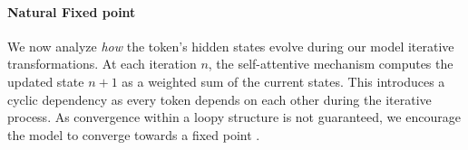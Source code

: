 
\paragraph{Natural Fixed point} We now analyze \textit{how} the token's hidden states evolve during our model iterative transformations. At each iteration $n$, the self-attentive mechanism \parencite{vaswani_17} computes the updated state $n+1$ as a weighted sum of the current states. This introduces a cyclic dependency as every token depends on each other during the iterative process. As convergence within a loopy structure is not guaranteed, we encourage the model to converge towards a fixed point \parencite{bai_19}.



